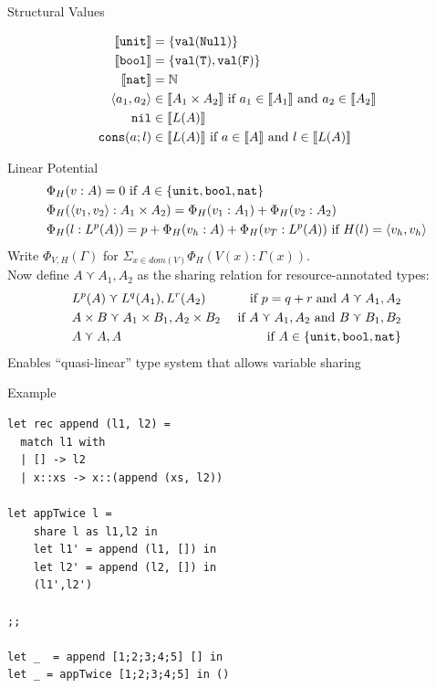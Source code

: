 \documentclass{beamer}
\newcommand{\irl}[1]{\mathtt{#1}}
\newcommand{\denote}[1]{\llbracket#1\rrbracket}
\newcommand{\val}[1]{\irl{val}(#1)}
\theoremstyle{definition}
\begin{document}
\begin{frame}{Structural Values}

\begin{align*}
	\denote{\unittyabt} &= \{\val{\irl{Null}}\}\\
	\denote{\booltyabt} &= \{\val{\irl{T}}, \val{\irl{F}}\}\\
	\denote{\irl{nat}} &= \mathbb{N}\\
\pairexcst{a_1}{a_2} &\in \denote{\prodtycst{A_1}{A_2}} 
	\text{ if } a_1 \in \denote{A_1} \text{ and } a_2 \in \denote{A_2}\\
\nilexcst &\in \denote{L(A)}\\
\consexcst{a}{l} &\in \denote{L(A)} \text{ if } a \in \denote{A} \text{ and } l \in \denote{L(A)}\\
\end{align*}
\end{frame}

\begin{frame}{Linear Potential}
\begin{align*}
	&\Phi_H(v : A) = 0 \text{ if } A \in \{\unittycst, \booltyabt, \irl{nat}\}\\
&\Phi_H(\pairexcst{v_1}{v_2} : \prodtycst{A_1}{A_2}) = \Phi_H(v_1 : A_1) + \Phi_H(v_2 : A_2)\\
	&\Phi_H(l : L^p(A)) = p + \Phi_H(v_h : A) + \Phi_H(v_T : L^p(A)) \text{ if } 
		H(l) = \pairexcst{v_h}{v_h}
\end{align*}
%
Write $\Phi_{V,H}(\Gamma)$ for $\Sigma_{x \in dom(V)} \Phi_H(V(x) : \Gamma(x))$.\\
Now define $A \curlyvee A_1,A_2$ as the sharing relation for resource-annotated types:
\begin{align*}
	&L^p(A) \curlyvee L^q(A_1),L^r(A_2) & \text{if } p = q + r \;\text{and}\; 
			A \curlyvee A_1,A_2\\
	&\prodtycst{A}{B} \curlyvee \prodtycst{A_1}{B_1}, \prodtycst{A_2}{B_2}
		&\text{ if } A \curlyvee A_1,A_2 \text{ and } B \curlyvee B_1,B_2\\
	&A \curlyvee  A,A& \text{ if } A \in \{\unittycst, \booltycst, \irl{nat}\}
\end{align*}
Enables ``quasi-linear'' type system that allows variable sharing
\end{frame}

\begin{frame}[fragile]{Example}
  \begin{verbatim}
let rec append (l1, l2) =
  match l1 with
  | [] -> l2
  | x::xs -> x::(append (xs, l2))

let appTwice l = 
    share l as l1,l2 in
    let l1' = append (l1, []) in 
    let l2' = append (l2, []) in 
    (l1',l2')

;;

let _  = append [1;2;3;4;5] [] in 
let _ = appTwice [1;2;3;4;5] in ()
  \end{verbatim}
\end{frame}
\end{document}
